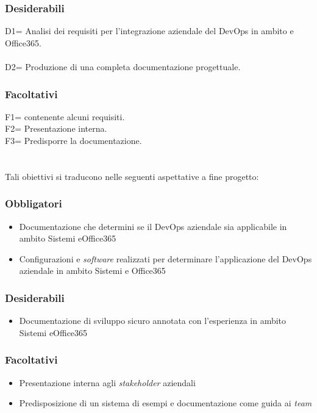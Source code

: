 \subsubsection*{Desiderabili}
D1= Analisi dei requisiti per l'integrazione aziendale del \gls{DevOps} in ambito  e Office365.\\\\
D2= Produzione di una completa documentazione progettuale.\\
\subsubsection*{Facoltativi}
F1=  contenente alcuni requisiti.\\
F2= Presentazione interna.\\
F3= Predisporre la documentazione.\\\\\\
Tali obiettivi si traducono nelle seguenti aspettative a fine progetto: 
\subsubsection*{Obbligatori}
\begin{itemize}
    \item Documentazione che determini se il \gls{DevOps} aziendale sia applicabile in ambito \gls{Sistemi} eOffice365
    \item Configurazioni e \emph{software} realizzati per determinare l'applicazione del \gls{DevOps} aziendale in ambito \gls{Sistemi} e Office365
\end{itemize}
\subsubsection*{Desiderabili}
\begin{itemize}
    \item Documentazione di sviluppo sicuro annotata con l'esperienza in ambito \gls{Sistemi} eOffice365
\end{itemize}
\subsubsection*{Facoltativi}
\begin{itemize}
    \item Presentazione interna agli \emph{stakeholder} aziendali
    \item Predisposizione di un sistema di esempi e documentazione come guida ai \emph{team}
\end{itemize}



